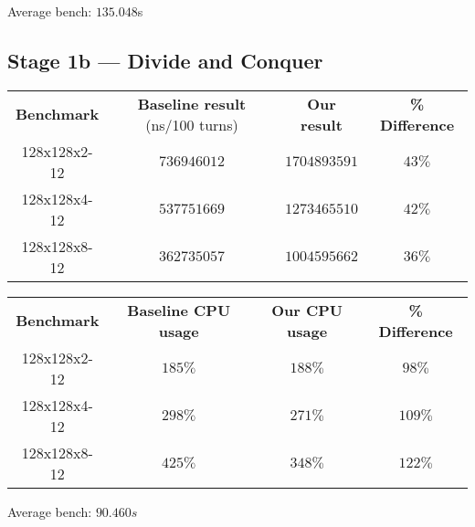 \documentclass[11pt,a4paper,dvipsnames,cmyk]{scrartcl}
\begin{document}
Average bench: $135.048$s

\subsection*{Stage 1b --- Divide and Conquer}%
\label{sub:divide-conquer}
\begin{center}
    \begin{tabular}{|c|c|c|c|}
        \hline
        \textbf{Benchmark} & \textbf{Baseline result} (ns/100 turns) &
        \textbf{Our result} & \textbf{\% Difference} \\ \hhline{|=|=|=|=|}
        128x128x2-12 & $736946012$ & $1704893591$ & $43\%$ \\ \hline
        128x128x4-12 & $537751669$ & $1273465510$ & $42\%$ \\ \hline
        128x128x8-12 & $362735057$ & $1004595662$ & $36\%$ \\ \hline
    \end{tabular}
\end{center}
\begin{center}
    \begin{tabular}{|c|c|c|c|}
        \hline
        \textbf{Benchmark} & \textbf{Baseline CPU usage} &
        \textbf{Our CPU usage} & \textbf{\% Difference} \\ \hhline{|=|=|=|=|}
        128x128x2-12 & $185\%$ & $188\%$ & $98\%$ \\ \hline
        128x128x4-12 & $298\%$ & $271\%$ & $109\%$ \\ \hline
        128x128x8-12 & $425\%$ & $348\%$ & $122\%$ \\ \hline
    \end{tabular}
\end{center}

Average bench: $90.460s$
\end{document}
